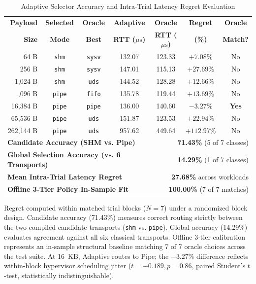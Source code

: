 \begin{table}[!t]
\centering
\caption{Adaptive Selector Accuracy and Intra-Trial Latency Regret Evaluation}
\label{tab:adaptive_results}
\scriptsize
\renewcommand{\arraystretch}{1.06}
\setlength{\tabcolsep}{2.2pt}
\begin{tabular*}{\columnwidth}{@{\extracolsep{\fill}}rcccccc}
\toprule
\textbf{Payload} & \textbf{Selected} & \textbf{Oracle} & \textbf{Adaptive} & \textbf{Oracle} & \textbf{Regret} & \textbf{Oracle} \\
\textbf{Size} & \textbf{Mode} & \textbf{Best} & \textbf{RTT ($\mu\text{s}$)} & \textbf{RTT ($\mu\text{s}$)} & \textbf{(\%)} & \textbf{Match?} \\
\midrule
64 B & \texttt{shm} & \texttt{sysv} & 132.07 & 123.33 & $+7.08\%$ & No \\
256 B & \texttt{shm} & \texttt{sysv} & 147.01 & 115.13 & $+27.69\%$ & No \\
1,024 B & \texttt{shm} & \texttt{uds} & 144.52 & 128.28 & $+12.66\%$ & No \\
\addlinespace[1.5pt]
4,096 B & \texttt{pipe} & \texttt{fifo} & 135.78 & 119.44 & $+13.69\%$ & No \\
16,384 B & \texttt{pipe} & \texttt{pipe} & 136.00 & 140.60 & $-3.27\%$ & \textbf{Yes} \\
65,536 B & \texttt{pipe} & \texttt{uds} & 151.87 & 123.53 & $+22.94\%$ & No \\
262,144 B & \texttt{pipe} & \texttt{uds} & 957.62 & 449.64 & $+112.97\%$ & No \\
\midrule
\multicolumn{4}{l}{\textbf{Candidate Accuracy (SHM vs. Pipe)}} & \multicolumn{3}{r}{\textbf{71.43\%} (5 of 7 classes)} \\
\multicolumn{4}{l}{\textbf{Global Selection Accuracy (vs. 6 Transports)}} & \multicolumn{3}{r}{\textbf{14.29\%} (1 of 7 classes)} \\
\multicolumn{4}{l}{\textbf{Mean Intra-Trial Latency Regret}} & \multicolumn{3}{r}{\textbf{27.68\%} across workloads} \\
\multicolumn{4}{l}{\textbf{Offline 3-Tier Policy In-Sample Fit}} & \multicolumn{3}{r}{\textbf{100.00\%} (7 of 7 matches)} \\
\bottomrule
\end{tabular*}
\vskip 2pt
{\tiny\noindent Regret computed within matched trial blocks ($N=7$) under a randomized block design. Candidate accuracy (71.43\%) measures correct routing strictly between the two compiled candidate transports (\texttt{shm} vs. \texttt{pipe}). Global accuracy (14.29\%) evaluates agreement against all six classical transports. Offline 3-tier calibration represents an in-sample structural baseline matching 7 of 7 oracle choices across the test suite. At 16~KB, Adaptive routes to Pipe; the $-3.27\%$ difference reflects within-block hypervisor scheduling jitter ($t = -0.189, p=0.86$, paired Student's $t$-test, statistically indistinguishable).\par}
\end{table}
